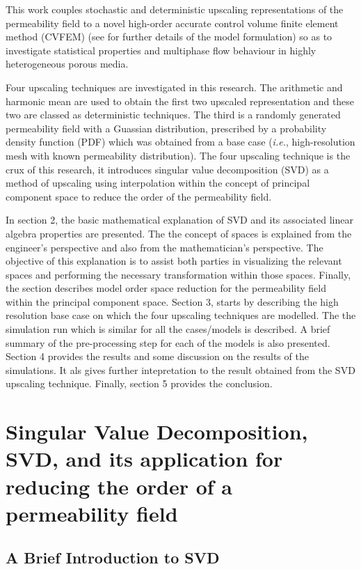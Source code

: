 \documentclass[preprint,12pt]{elsarticle}
\begin{document}
This work couples stochastic and deterministic upscaling representations of the permeability field to a novel high-order accurate control volume finite element method (CVFEM) (see \cite{Gomes_2017} for further details of the model formulation) so as to investigate statistical properties and multiphase flow behaviour in highly heterogeneous porous media. 

Four upscaling techniques are investigated in this research. The arithmetic and harmonic mean are used to obtain the first two upscaled representation and these two are classed as deterministic techniques. The third is a randomly generated permeability field with a Guassian distribution, prescribed by a probability density function (PDF) which was obtained from a base case ({\it i.e.}, high-resolution mesh with known permeability distribution). The four upscaling technique is the crux of this research, it introduces singular value decomposition (SVD) as a method of upscaling using interpolation within the concept of principal component space to reduce the order of the permeability field.

In section 2, the basic mathematical explanation of SVD and its associated linear algebra properties are presented. The the concept of spaces is explained from the engineer's perspective and also from the mathematician's perspective. The objective of this explanation is to assist both parties in visualizing the relevant spaces and performing the necessary transformation within those spaces. Finally, the section describes model order space reduction for the permeability field within the principal component space. Section 3, starts by describing the high resolution base case on which the four upscaling techniques are modelled. The the simulation run which is similar for all the cases/models is described. A brief summary of the pre-processing step for each of the models is also presented. Section 4 provides the results and some discussion on the results of the simulations. It als gives further intepretation to the result obtained from the SVD upscaling technique. Finally, section 5 provides the conclusion.


\section{Singular Value Decomposition, SVD, and its application for reducing the order of a permeability field}\label{section:svd}
\subsection{A Brief Introduction to SVD}\label{subsection:svd_brief}
\end{document}
